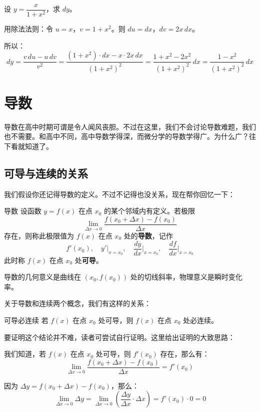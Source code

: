 \begin{myexample}
  设 $y = \dfrac{x}{1+x^2}$，求 $dy$。

  用除法法则：令 $u = x$，$v = 1+x^2$。则 $du = dx$，$dv = 2x\, dx$。

  所以：
  \[
  dy = \frac{v\, du - u\, dv}{v^2}
  = \frac{(1+x^2) \cdot dx - x \cdot 2x\, dx}{(1+x^2)^2}
  = \frac{1 + x^2 - 2x^2}{(1+x^2)^2}\, dx
  = \frac{1 - x^2}{(1+x^2)^2}\, dx
  \]
\end{myexample}

\section{导数}

导数在高中时期可谓是令人闻风丧胆。不过在这里，我们不会讨论导数难题，我们也不需要。和高中不同，高中导数学得深，而微分学的导数学得广。为什么广？往下看就知道了。

\subsection{可导与连续的关系}
我们假设你还记得导数的定义。不过不记得也没关系，现在帮你回忆一下：

\begin{definition}{导数}{}
设函数 $y = f(x)$ 在点 $x_0$ 的某个邻域内有定义。若极限
\[
\lim_{\Delta x \to 0} \frac{f(x_0 + \Delta x) - f(x_0)}{\Delta x}
\]
存在，则称此极限值为 $f(x)$ 在点 $x_0$ 处的\textbf{导数}，记作
\[
f'(x_0),\quad y'\big|_{x=x_0},\quad \frac{dy}{dx}\Big|_{x=x_0},\quad \frac{df}{dx}\Big|_{x=x_0}
\]
此时称 $f(x)$ 在点 $x_0$ 处\textbf{可导}。
\end{definition}

导数的几何意义是曲线在 $(x_0, f(x_0))$ 处的切线斜率，物理意义是瞬时变化率。

关于导数和连续两个概念，我们有这样的关系：

\begin{theorem}{可导必连续}{}
若 $f(x)$ 在点 $x_0$ 处可导，则 $f(x)$ 在点 $x_0$ 处必连续。
\end{theorem}

要证明这个结论并不难，读者可尝试自行证明。这里给出证明的大致思路：

我们知道，若 $f(x)$ 在点 $x_0$ 处可导，则 $f'(x_0)$ 存在，那么有：
\[
\lim_{\Delta x \to 0} \frac{f(x_0 + \Delta x) - f(x_0)}{\Delta x} = f'(x_0)
\]

因为 $\Delta y = f(x_0 + \Delta x) - f(x_0)$，那么：
\[
\lim_{\Delta x \to 0} \Delta y
= \lim_{\Delta x \to 0} ( \frac{\Delta y}{\Delta x} \cdot \Delta x )
= f'(x_0) \cdot 0 = 0
\]

